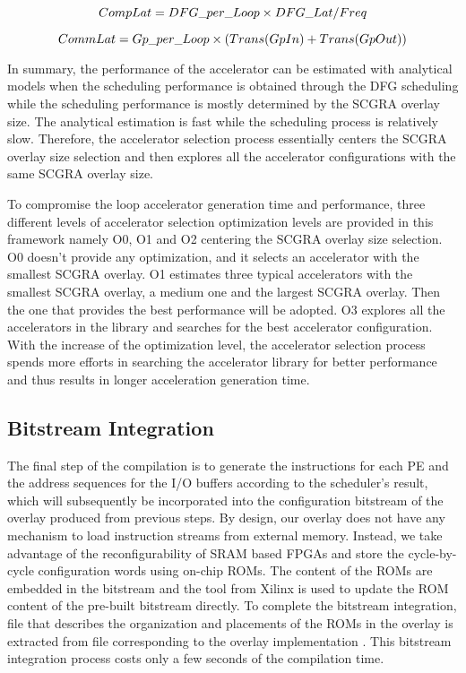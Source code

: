 \begin{equation} \label{eq:comp-lat}
    \footnotesize
    CompLat = DFG\_per\_Loop \times DFG\_Lat / Freq
\end{equation}


\begin{equation} \label{eq:comm-lat}
    \footnotesize
    CommLat = Gp\_per\_Loop \times (Trans(GpIn) + Trans(GpOut))
\end{equation}


In summary, the performance of the accelerator can be estimated with analytical models when the scheduling performance is obtained through the DFG scheduling while the scheduling performance is mostly determined by the SCGRA overlay size. The analytical estimation is fast while the scheduling process is relatively slow. Therefore, the accelerator selection process essentially centers the SCGRA overlay size selection and then explores all the accelerator configurations with the same SCGRA overlay size. 

To compromise the loop accelerator generation time and performance, three different levels of accelerator selection optimization levels are provided in this framework namely O0, O1 and O2 centering the SCGRA overlay size selection. O0 doesn't provide any optimization, and it selects an accelerator with the smallest SCGRA overlay. O1 estimates three typical accelerators with the smallest SCGRA overlay, a medium one and the largest SCGRA overlay. Then the one that provides the best performance will be adopted. O3 explores all the accelerators in the library and searches for the best accelerator configuration. With the increase of the optimization level, the accelerator selection process spends more efforts in searching the accelerator library for better performance and thus results in longer acceleration generation time.

\subsection{Bitstream Integration}
The final step of the compilation is to generate the instructions for each PE and the address sequences for the I/O buffers according to the scheduler's result, which will subsequently be incorporated into the configuration bitstream of the overlay produced from previous steps.
By design, our overlay does not have any mechanism to load instruction streams from external memory.
Instead, we take advantage of the reconfigurability of SRAM based FPGAs and store the cycle-by-cycle configuration words using on-chip ROMs. The content of the ROMs are embedded in the bitstream and the  tool from Xilinx \cite{data2mem} is used to update the ROM content of the pre-built bitstream directly. To complete the bitstream integration,  file that describes the organization and placements of the ROMs in the overlay is extracted from  file corresponding to the overlay implementation \cite{beckhoff2011xilinx}.
This bitstream integration process costs only a few seconds of the compilation time.


